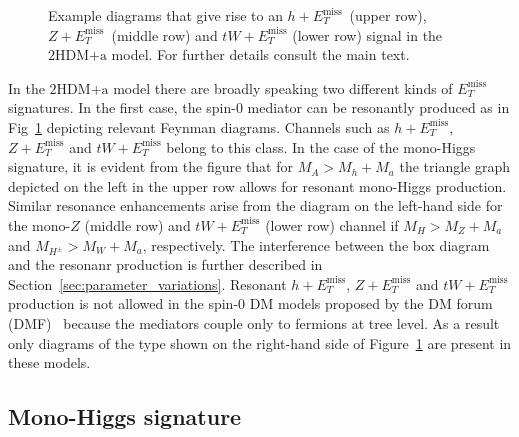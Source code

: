 \documentclass[a4paper, 11pt,notoc]{article}
\newcommand{\MET}{\ensuremath{E_T^\mathrm{miss}}\xspace}
\newcommand{\hdma}{\ensuremath{\textrm{2HDM+a}}\xspace}
\begin{document}
\begin{figure}[t!]
\vspace{4mm}
\caption{\label{fig:resonant} Example diagrams that give rise to an $h+\MET$~(upper row), $Z+\MET$~(middle row) and $tW + \MET$ (lower row) signal in the \hdma model. For further details consult the main text. }
\end{figure}

In the \hdma model there are broadly speaking two different kinds of $\MET$ signatures. In the first case, the spin-0 mediator can be resonantly produced as in Fig~\ref{fig:resonant} depicting relevant Feynman diagrams. Channels such as $h+\MET$, $Z+ \MET$ and $tW+\MET$ belong to this class. In the case of the mono-Higgs signature, it is evident from the figure that for $M_A > M_h + M_a$ the triangle  graph depicted on the left in the upper row  allows for resonant mono-Higgs production.  Similar resonance enhancements arise from the diagram on the left-hand side for the mono-$Z$ (middle row) and $tW+\MET$ (lower row) channel if $M_H > M_Z + M_a$ and $M_{H^\pm} > M_W + M_a$, respectively. The interference between the box diagram and the resonanr production is further described in Section~\ref{sec:parameter_variations}. Resonant $h+\MET$, $Z+\MET$ and $tW+\MET$ production is not allowed in the spin-0 DM models proposed by the DM forum (DMF)~\cite{Abercrombie:2015wmb} because the mediators couple only to fermions at tree level. As a result only diagrams of the type shown on the right-hand side of Figure~\ref{fig:resonant} are present in these models. 

\subsection{Mono-Higgs signature}
\end{document}
